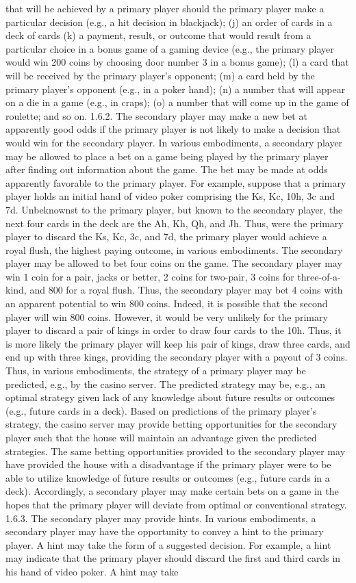 \documentclass[11pt,a4paper]{article}
\begin{document}
that will be achieved by a primary player should the primary player make a particular decision (e.g., a hit decision in blackjack); (j) an order of cards in a deck of cards (k) a payment, result, or outcome that would result from a particular choice in a bonus game of a gaming device (e.g., the primary player would win 200 coins by choosing door number 3 in a bonus game); (l) a card that will be received by the primary player's opponent; (m) a card held by the primary player's opponent (e.g., in a poker hand); (n) a number that will appear on a die in a game (e.g., in craps); (o) a number that will come up in the game of roulette; and so on. 1.6.2. The secondary player may make a new bet at apparently good odds if the primary player is not likely to make a decision that would win for the secondary player. In various embodiments, a secondary player may be allowed to place a bet on a game being played by the primary player after finding out information about the game. The bet may be made at odds apparently favorable to the primary player. For example, suppose that a primary player holds an initial hand of video poker comprising the Ks, Kc, 10h, 3c and 7d. Unbeknownst to the primary player, but known to the secondary player, the next four cards in the deck are the Ah, Kh, Qh, and Jh. Thus, were the primary player to discard the Ks, Kc, 3c, and 7d, the primary player would achieve a royal flush, the highest paying outcome, in various embodiments. The secondary player may be allowed to bet four coins on the game. The secondary player may win 1 coin for a pair, jacks or better, 2 coins for two-pair, 3 coins for three-of-a-kind, and 800 for a royal flush. Thus, the secondary player may bet 4 coins with an apparent potential to win 800 coins. Indeed, it is possible that the second player will win 800 coins. However, it would be very unlikely for the primary player to discard a pair of kings in order to draw four cards to the 10h. Thus, it is more likely the primary player will keep his pair of kings, draw three cards, and end up with three kings, providing the secondary player with a payout of 3 coins. Thus, in various embodiments, the strategy of a primary player may be predicted, e.g., by the casino server. The predicted strategy may be, e.g., an optimal strategy given lack of any knowledge about future results or outcomes (e.g., future cards in a deck). Based on predictions of the primary player's strategy, the casino server may provide betting opportunities for the secondary player such that the house will maintain an advantage given the predicted strategies. The same betting opportunities provided to the secondary player may have provided the house with a disadvantage if the primary player were to be able to utilize knowledge of future results or outcomes (e.g., future cards in a deck). Accordingly, a secondary player may make certain bets on a game in the hopes that the primary player will deviate from optimal or conventional strategy. 1.6.3. The secondary player may provide hints. In various embodiments, a secondary player may have the opportunity to convey a hint to the primary player. A hint may take the form of a suggested decision. For example, a hint may indicate that the primary player should discard the first and third cards in his hand of video poker. A hint may take 
\end{document}
